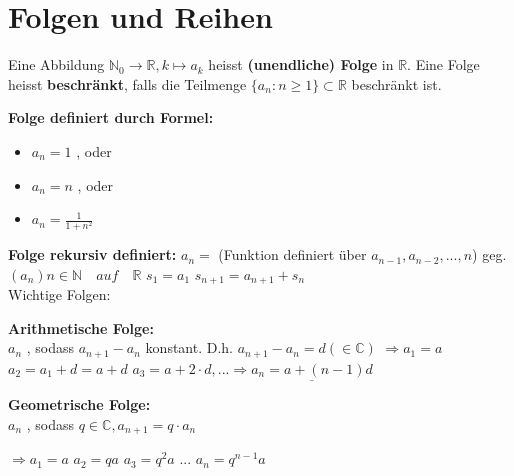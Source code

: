 \chapter{Folgen und Reihen}


\begin{definition}[Folgen]
	Eine Abbildung $\mathbb{N}_0 \rightarrow \mathbb{R}, k \mapsto a_k$ heisst \textbf{(unendliche) Folge} in $\mathbb{R}$.
    Eine Folge heisst \textbf{beschränkt}, falls die Teilmenge $\{a_n : n \geq 1\} \subset \mathbb{R}$ beschränkt ist.
\end{definition}

\begin{example}
\textbf{Folge definiert durch Formel:}
	\begin{itemize}
	\item $a_n = 1$ , oder
    \item $a_n = n$ , oder
    \item $a_n = \frac{1}{1+n^2}$
	\end{itemize}
	
	\noindent\textbf{Folge rekursiv definiert:}
	$a_n =$ (Funktion definiert über $a_{n-1},a_{n-2},...,n$)\newline
	geg. $(a_n) n \in \mathbb{N} \quad auf \quad\mathbb{R}$\newline
	\tab $s_1 = a_1$\newline
	\tab $s_{n+1} = a_{n+1}+s_n$\\
	
	\noindent Wichtige Folgen:
	
	\noindent\textbf{Arithmetische Folge:}\\
	$a_n$ , sodass $a_{n+1}-a_n$ konstant. D.h. $a_{n+1}-a_n = d (\in \mathbb{C})$\newline
	 $\Rightarrow a_1 = a$\newline
	\hspace*{0.32cm} $a_2= a_1 +d = a+d$\newline
	\hspace*{0.32cm} $a_3 = a+2\cdot d,...\Rightarrow \underline{a_n = a+(n-1)d}$
	
	\noindent\textbf{Geometrische Folge:}\\
	$a_n$ , sodass $q \in \mathbb{C}, a_{n+1} = q\cdot a_n$
	
	\noindent$\Rightarrow a_1 = a$\newline
	\hspace*{0.32cm} $a_2= qa$\newline
	\hspace*{0.32cm} $a_3 = q^2a$\newline
	\tab ...\newline
	\hspace*{0.32cm} \underline{$a_n = q^{n-1}a$}
\end{example}

